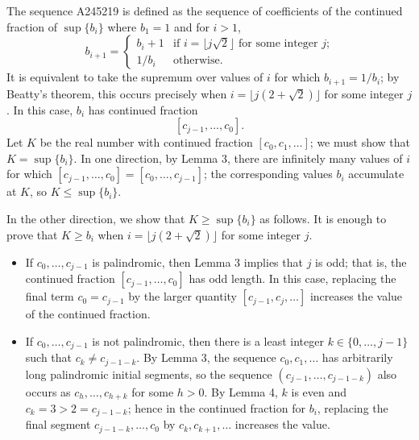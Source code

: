 \documentclass[amssymb,twocolumn,pra,10pt,aps]{revtex4-1}
\begin{document}
\begin{itemize}
The sequence A245219 is defined as the sequence of coefficients of the continued fraction of $\sup\{b_i\}$ where $b_1 = 1$
and for $i>1$,
\[
b_{i+1} = \begin{cases} b_i+1 & \mbox{if $i = \lfloor j\sqrt{2} \rfloor$ for some integer $j$;} \\
1/b_i & \mbox{otherwise.}
\end{cases}
\]
It is equivalent to take the supremum over values of $i$ for which $b_{i+1} = 1/b_i$; by Beatty's theorem,
this occurs precisely when $i = \lfloor j(2+\sqrt{2})\rfloor$ for some integer $j$.
In this case, $b_i$ has continued fraction
\[
[c_{j-1}, \dots, c_0].
\]
Let $K$ be the real number with continued fraction $[c_0, c_1, \dots]$; we must show that $K = \sup\{b_i\}$.
In one direction, by Lemma 3, there are infinitely many values of $i$ for which $[c_{j-1}, \dots, c_0] = [c_0, \dots, c_{j-1}]$;
the corresponding values $b_i$ accumulate at $K$, so $K \leq\sup\{b_i\}$.

In the other direction, we show that $K \geq \sup\{b_i\}$ as follows. It is enough to prove that $K \geq b_i$ when $i = \lfloor j(2+\sqrt{2})\rfloor$ for some integer $j$.
\begin{itemize}
\item
If $c_0,\dots,c_{j-1}$ is palindromic, then Lemma 3 implies that $j$ is odd; that is, the continued fraction $[c_{j-1},\dots,c_0]$
has odd length. In this case, replacing the final term $c_0 = c_{j-1}$
by the larger quantity $[c_{j-1}, c_j, \dots]$ increases the value of the continued fraction.
\item
If $c_0,\dots,c_{j-1}$ is not palindromic, then there is a least integer $k \in \{0,\dots,j-1\}$ such that $c_k\neq c_{j-1-k}$.
By Lemma 3, the sequence $c_0, c_1, \dots$ has arbitrarily long palindromic initial segments, so
the sequence $(c_{j-1},\dots, c_{j-1-k})$ also occurs as $c_h, \dots, c_{h+k}$ for some $h>0$.
By Lemma 4, $k$ is even and $c_k = 3 > 2 = c_{j-1-k}$; 
hence in the continued fraction for $b_i$, replacing the final segment $c_{j-1-k},\dots,c_0$ by $c_k, c_{k+1}, \dots$ increases the value.
\end{itemize}





\end{itemize}
\end{document}
